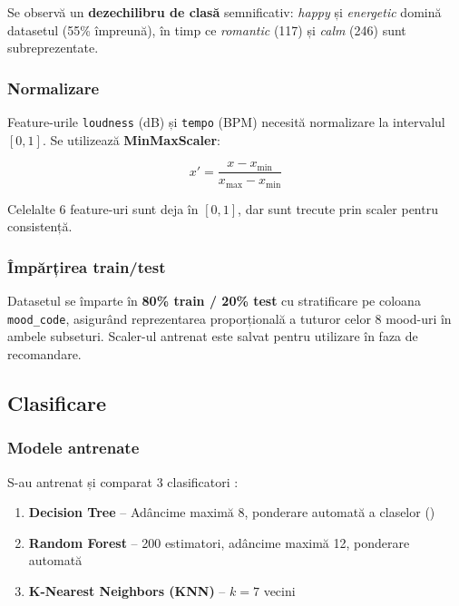 \documentclass[12pt,a4paper]{article}
\begin{document}
Se observă un \textbf{dezechilibru de clasă} semnificativ: \textit{happy} și \textit{energetic} domină datasetul (55\% împreună), în timp ce \textit{romantic} (117) și \textit{calm} (246) sunt subreprezentate.

\subsubsection{Normalizare}

Feature-urile \texttt{loudness} (dB) și \texttt{tempo} (BPM) necesită normalizare la intervalul $[0, 1]$. Se utilizează \textbf{MinMaxScaler}:

\begin{equation}
x' = \frac{x - x_{\min}}{x_{\max} - x_{\min}}
\end{equation}

Celelalte 6 feature-uri sunt deja în $[0, 1]$, dar sunt trecute prin scaler pentru consistență.

\subsubsection{Împărțirea train/test}

Datasetul se împarte în \textbf{80\% train / 20\% test} cu stratificare pe coloana \texttt{mood\_code}, asigurând reprezentarea proporțională a tuturor celor 8 mood-uri în ambele subseturi. Scaler-ul antrenat este salvat pentru utilizare în faza de recomandare.

\FloatBarrier

\subsection{Clasificare}
\label{sec:clasificare}

\subsubsection{Modele antrenate}

S-au antrenat și comparat 3 clasificatori \cite{sklearn}:

\begin{enumerate}
    \item \textbf{Decision Tree} -- Adâncime maximă 8, ponderare automată a claselor ()
    \item \textbf{Random Forest} \cite{breiman2001} -- 200 estimatori, adâncime maximă 12, ponderare automată
    \item \textbf{K-Nearest Neighbors (KNN)} \cite{fix1951} -- $k = 7$ vecini
\end{enumerate}
\end{document}
